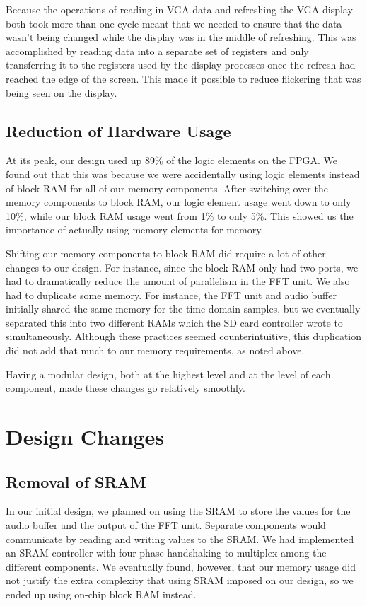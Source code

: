 \documentclass{article}
\begin{document}
Because the operations of reading in VGA data and refreshing the VGA display both 
took more than one cycle meant that we needed to ensure that the data wasn't being 
changed while the display was in the middle of refreshing. This was accomplished by 
reading data into a separate set of registers and only transferring it to the registers 
used by the display processes once the refresh had reached the edge of the screen.  
This made it possible to reduce flickering that was being seen on the display.

\subsection{Reduction of Hardware Usage}

At its peak, our design used up 89\% of the logic elements on the FPGA. We found out 
that this was because we were accidentally using logic elements instead of block 
RAM for all of our memory components. After switching over the memory components 
to block RAM, our logic element usage went down to only 10\%, while our block RAM 
usage went from 1\% to only 5\%. This showed us the importance of actually using 
memory elements for memory.

Shifting our memory components to block RAM did require a lot of other changes to 
our design. For instance, since the block RAM only had two ports, we had to 
dramatically reduce the amount of parallelism in the FFT unit. We also had to 
duplicate some memory. For instance, the FFT unit and audio buffer initially shared 
the same memory for the time domain samples, but we eventually separated this into 
two different RAMs which the SD card controller wrote to simultaneously. Although 
these practices seemed counterintuitive, this duplication did not add that much to our 
memory requirements, as noted above. 

Having a modular design, both at the highest level and at the level of each
component, made these changes go relatively smoothly.

\section{Design Changes}
\subsection{Removal of SRAM}

In our initial design, we planned on using the SRAM to store the values for the audio 
buffer and the output of the FFT unit. Separate components would communicate by 
reading and writing values to the SRAM. We had implemented an SRAM controller 
with four-phase handshaking to multiplex among the different components. We 
eventually found, however, that our memory usage did not justify the extra complexity 
that using SRAM imposed on our design, so we ended up using on-chip block RAM 
instead.
\end{document}
